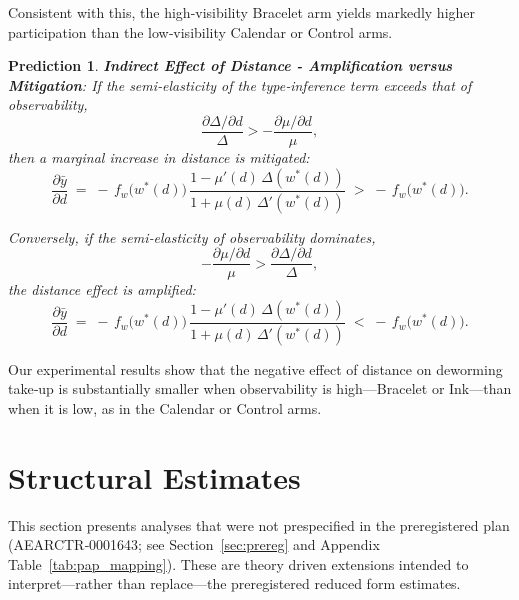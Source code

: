 \documentclass[12pt,a4paper]{article}
\newtheorem{prediction}{Prediction}
\begin{document}
Consistent with this, the high-visibility Bracelet arm yields markedly higher participation than the low‑visibility Calendar or Control arms.


\begin{prediction}\label{pred:amp-mit-mu}
{\rm \textbf{Indirect Effect of Distance - Amplification versus  Mitigation}}: If the semi‑elasticity of the type‑inference term exceeds that of observability,
\[
\frac{\partial\Delta/\partial d}{\Delta}
>
-\frac{\partial\mu/\partial d}{\mu},
\]
then a marginal increase in distance is mitigated:
\begin{equation}\label{eq:mit}
\frac{\partial\bar y}{\partial d}
\;=\;
-\,f_w\!\bigl(w^{\ast}(d)\bigr)\,
       \frac{1-\mu'(d)\,\Delta(w^{\ast}(d))}
            {1+\mu(d)\,\Delta'(w^{\ast}(d))}  
\;>\;
-\,f_w\!\bigl(w^{\ast}(d)\bigr). \nonumber 
\end{equation}

Conversely, if the semi‑elasticity of observability dominates,
\[
-\frac{\partial\mu/\partial d}{\mu}
>
\frac{\partial\Delta/\partial d}{\Delta},
\]
the distance effect is amplified:
\begin{equation}\label{eq:amp}
\frac{\partial\bar y}{\partial d}
\;=\;
-\,f_w\!\bigl(w^{\ast}(d)\bigr)\,
       \frac{1-\mu'(d)\,\Delta(w^{\ast}(d))}
            {1+\mu(d)\,\Delta'(w^{\ast}(d))}  
\;<\;
-\,f_w\!\bigl(w^{\ast}(d)\bigr). \nonumber 
\end{equation}
\end{prediction}

Our experimental results show that the negative effect of distance on deworming take‑up is substantially smaller when observability is high—Bracelet or Ink—than when it is low, as in the Calendar or Control arms.

\section{Structural Estimates} \label{structural}

This section presents analyses that were not prespecified in the preregistered plan (AEARCTR‑0001643; see Section~\ref{sec:prereg} and Appendix Table~\ref{tab:pap_mapping}). These are theory driven extensions intended to interpret—rather than replace—the preregistered reduced form estimates.
\end{document}
